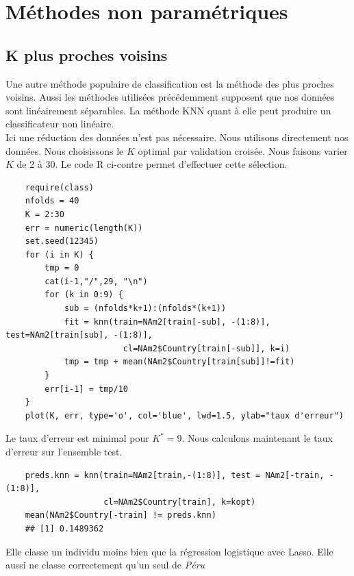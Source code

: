 \documentclass[12pt,a4paper]{article}
\begin{document}
\section{Méthodes non paramétriques}
\subsection{K plus proches voisins}
Une autre méthode populaire de classification est la méthode des plus proches voisins. Aussi les méthodes utilisées précédemment supposent que nos données sont linéairement séparables. La méthode KNN quant à elle peut produire un classificateur non linéaire.\vspace{3mm}\\
Ici une réduction des données n'est pas nécessaire. Nous utilisons directement nos données. Nous choisissons le $K$ optimal par validation croisée. Nous faisons varier $K$ de 2 à 30. Le code R ci-contre permet d'effectuer cette sélection.\vspace{2mm}
\begin{lstlisting}
	require(class)
	nfolds = 40
	K = 2:30
	err = numeric(length(K))
	set.seed(12345)
	for (i in K) {
		tmp = 0
		cat(i-1,"/",29, "\n")
		for (k in 0:9) {
			sub = (nfolds*k+1):(nfolds*(k+1))
			fit = knn(train=NAm2[train[-sub], -(1:8)], test=NAm2[train[sub], -(1:8)],
						cl=NAm2$Country[train[-sub]], k=i)
			tmp = tmp + mean(NAm2$Country[train[sub]]!=fit)
		}
		err[i-1] = tmp/10
	}
	plot(K, err, type='o', col='blue', lwd=1.5, ylab="taux d'erreur")
\end{lstlisting}
Le taux d'erreur est minimal pour $K^* = 9$. Nous calculons maintenant le taux d'erreur sur l'ensemble test. \vspace{2mm}
\begin{lstlisting}
	preds.knn = knn(train=NAm2[train,-(1:8)], test = NAm2[-train, -(1:8)],
	                cl=NAm2$Country[train], k=kopt)
	mean(NAm2$Country[-train] != preds.knn)
	## [1] 0.1489362
\end{lstlisting}
Elle classe un individu moins bien que la régression logistique avec Lasso. Elle aussi ne classe correctement qu'un seul de \textit{Péru}
\end{document}
